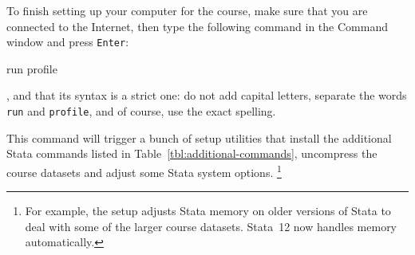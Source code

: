 	To finish setting up your computer for the course, make sure that you are connected to the Internet, then type the following command in the Command window and press \texttt{Enter}:%
		
		\begin{docspec}
			run profile
		\end{docspec}
	
	, and that its syntax is a strict one: do not add capital letters, separate the words \texttt{run} and \texttt{profile}, and of course, use the exact spelling.%
	
	This command will trigger a bunch of setup utilities that install the additional Stata commands listed in Table~\ref{tbl:additional-commands}, uncompress the course datasets and adjust some Stata system options.%
		\footnote{For example, the setup adjusts Stata memory on older versions of Stata to deal with some of the larger course datasets. Stata~12 now handles memory automatically.} %
		
	\bigskip
 
